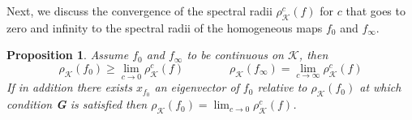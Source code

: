 \documentclass{article}
\newtheorem{proposition}[theorem]{Proposition}
\newcommand{\cradius}{\rho_{\cone}}
\newcommand{\cone}{\mathcal{K}}
\begin{document}
%
%
Next, we discuss the convergence of the spectral radii $\cradius^c(f)$ for $c$ that goes to zero and infinity to the spectral radii of the homogeneous maps $f_0$ and $f_{\infty}$.
%
\begin{proposition}\label{prop_limits_of_subhomogeneous_eigenpairs}
    Assume $f_0$ and $f_{\infty}$ to be continuous on $\cone$, then 
    \begin{equation}
        \cradius(f_0)\geq\lim_{c\rightarrow 0}\cradius^c(f) 
        \qquad  \qquad 
        \cradius(f_{\infty})=\lim_{c\rightarrow \infty}\cradius^c(f)
    \end{equation}
    If in addition there exists $x_{f_0}$ an eigenvector of $f_0$ relative to $\cradius(f_0)$ at which condition \textbf{G} is satisfied then $\cradius(f_0)=\lim_{c\rightarrow 0}\cradius^c(f)$.
\end{proposition}
\end{document}
